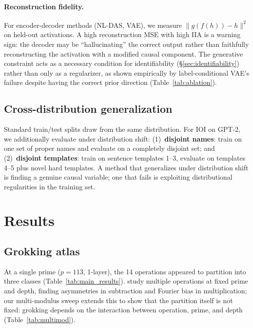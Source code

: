 \documentclass{article}
\begin{document}
\paragraph{Reconstruction fidelity.}
For encoder-decoder methods (NL-DAS, VAE), we measure $\|g(f(h)) - h\|^2$ on
held-out activations. A high reconstruction MSE with high IIA is a warning sign:
the decoder may be ``hallucinating'' the correct output rather than faithfully
reconstructing the activation with a modified causal component.
The generative constraint acts as a necessary condition for identifiability
(\S\ref{sec:identifiability}) rather than only as a regularizer, as shown
empirically by label-conditional VAE's failure despite having the correct prior direction
(Table~\ref{tab:ablation}).

\subsection{Cross-distribution generalization}
\label{sec:cross_distribution}

Standard train/test splits draw from the same distribution. For IOI on GPT-2, we
additionally evaluate under distribution shift: (1)~\textbf{disjoint names}: train on one set of proper names and evaluate on a
completely disjoint set; and (2)~\textbf{disjoint templates}: train on sentence
templates 1--3, evaluate on
templates 4--5 plus novel hard templates. A method that generalizes under
distribution shift is finding a genuine causal variable; one that fails is
exploiting distributional regularities in the training set.


\section{Results}
\label{sec:results}

\subsection{Grokking atlas}

At a single prime ($p{=}113$, 1-layer), the 14 operations appeared to partition
into three classes (Table~\ref{tab:main_results}).
\citet{furuta2024modular} study multiple operations at fixed prime and depth,
finding asymmetries in subtraction and Fourier bias in multiplication; our
multi-modulus sweep extends this to show that the partition itself is not fixed:
grokking depends on the interaction between operation, prime, and depth
(Table~\ref{tab:multimod}).
\end{document}
